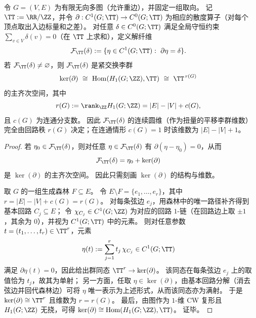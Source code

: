 \begin{theorem}\label{thm:spg-boundary-torus-fiber-cycle-rank}
令 \(G=(V,E)\) 为有限无向多图（允许重边），并固定一组取向。
记 \(\TT:=\RR/\ZZ\)，并令 \(\partial:C^1(G;\TT)\to C^0(G;\TT)\) 为相应的散度算子（对每个顶点取出入边标量和之差）。
对任意 \(\delta\in C^0(G;\TT)\) 满足全局守恒约束 \(\sum_{v\in V}\delta(v)=0\)（在 \(\TT\) 上求和），定义解纤维
\[
\mathcal F_{\TT}(\delta):=\{\eta\in C^1(G;\TT):\ \partial\eta=\delta\}.
\]
若 \(\mathcal F_{\TT}(\delta)\neq\varnothing\)，则 \(\mathcal F_{\TT}(\delta)\) 是紧交换李群
\[
\ker(\partial)\ \cong\ \mathrm{Hom}(H_1(G;\ZZ),\TT)\ \cong\ \TT^{\,r(G)}
\]
的主齐次空间，其中
\[
r(G):=\rank_{\ZZ}H_1(G;\ZZ)=|E|-|V|+c(G),
\]
且 \(c(G)\) 为连通分支数。
因此 \(\mathcal F_{\TT}(\delta)\) 的连续圆维（作为扭量的平移李群维数）完全由回路秩 \(r(G)\) 决定；在连通情形 \(c(G)=1\) 时该维数为 \(|E|-|V|+1\)。
\end{theorem}
\begin{proof}
若 \(\eta_0\in \mathcal F_{\TT}(\delta)\)，则对任意 \(\eta\in \mathcal F_{\TT}(\delta)\) 有 \(\partial(\eta-\eta_0)=0\)，从而
\[
\mathcal F_{\TT}(\delta)=\eta_0+\ker(\partial)
\]
是 \(\ker(\partial)\) 的主齐次空间。
因此只需刻画 \(\ker(\partial)\) 的结构与维数。

取 \(G\) 的一组生成森林 \(F\subseteq E\)。
令 \(E\setminus F=\{e_1,\dots,e_{r}\}\)，其中 \(r=|E|-|V|+c(G)=r(G)\)。
对每条弦边 \(e_j\)，用森林中的唯一路径补齐得到基本回路 \(C_j\subseteq E\)；
令 \(\chi_{C_j}\in C^1(G;\ZZ)\) 为对应的回路 \(1\)-链（在回路边上取 \(\pm1\)，其余为 \(0\)），并视为 \(C^1(G;\TT)\) 中的元素。
则对任意参数 \(t=(t_1,\dots,t_r)\in\TT^r\)，元素
\[
\eta(t):=\sum_{j=1}^r t_j\,\chi_{C_j}\in C^1(G;\TT)
\]
满足 \(\partial\eta(t)=0\)，因此给出群同态 \(\TT^r\to\ker(\partial)\)。
该同态在每条弦边 \(e_j\) 上的取值恰为 \(t_j\)，故其为单射；
另一方面，任取 \(\eta\in\ker(\partial)\)，由基本回路分解（消去弦边并回代森林边）可将 \(\eta\) 唯一表示为上述形式，从而该同态亦为满射。
于是 \(\ker(\partial)\cong \TT^r\) 且维数为 \(r=r(G)\)。
最后，由图作为 \(1\)-维 CW 复形且 \(H_1(G;\ZZ)\) 无挠，可得 \(\ker(\partial)\cong \mathrm{Hom}(H_1(G;\ZZ),\TT)\)。
证毕。
\end{proof}

\endinput


